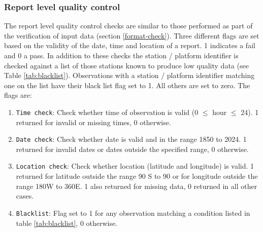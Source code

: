 \subsubsection{Report level quality control} \label{report-qc}
The report level quality control checks are similar to those performed as part of the verification of input data (section \ref{format-check}).
Three different flags are set based on the validity of the date, time and location of a report. 1 indicates a fail and 0 a pass.
In addition to these checks the station / platform identifier is checked against a list of those stations known to produce low quality data (see Table \ref{tab:blacklist}). 
Observations with a station / platform identifier matching one on the list have their black list flag set to 1. All others are set to zero.
The flags are:
\begin{enumerate}
\item \texttt{Time check}: Check whether time of observation is valid (0 $\leq$ hour $\leq$ 24). 1 returned for invalid or missing times, 0 otherwise.
\item \texttt{Date check}: Check whether date is valid and in the range 1850 to 2024. 1 returned for invalid dates or dates outside the specified range, 0 otherwise.
\item \texttt{Location check}: Check whether location (latitude and longitude) is valid. 1 returned for latitude outside the range 90 S to 90 or for longitude outside the range 180W to 360E. 1 also returned for missing data, 0 returned in all other cases.
\item \texttt{Blacklist}: Flag set to 1 for any observation matching a condition listed in table \ref{tab:blacklist}, 0 otherwise.
\end{enumerate}

